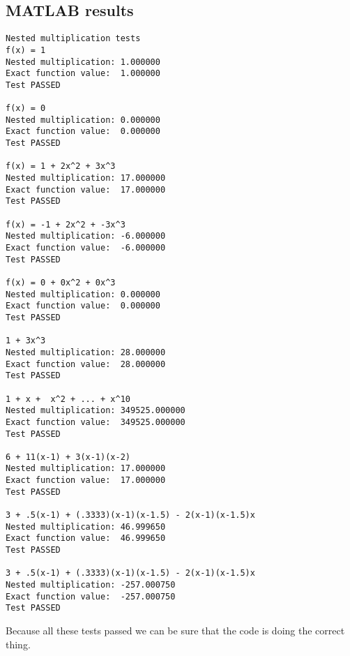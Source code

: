 \documentclass[]{article}
\begin{document}
\subsection*{MATLAB results}
\begin{verbatim}
Nested multiplication tests
f(x) = 1
Nested multiplication: 1.000000
Exact function value:  1.000000
Test PASSED

f(x) = 0
Nested multiplication: 0.000000
Exact function value:  0.000000
Test PASSED

f(x) = 1 + 2x^2 + 3x^3
Nested multiplication: 17.000000
Exact function value:  17.000000
Test PASSED

f(x) = -1 + 2x^2 + -3x^3
Nested multiplication: -6.000000
Exact function value:  -6.000000
Test PASSED

f(x) = 0 + 0x^2 + 0x^3
Nested multiplication: 0.000000
Exact function value:  0.000000
Test PASSED

1 + 3x^3
Nested multiplication: 28.000000
Exact function value:  28.000000
Test PASSED

1 + x +  x^2 + ... + x^10
Nested multiplication: 349525.000000
Exact function value:  349525.000000
Test PASSED

6 + 11(x-1) + 3(x-1)(x-2)
Nested multiplication: 17.000000
Exact function value:  17.000000
Test PASSED

3 + .5(x-1) + (.3333)(x-1)(x-1.5) - 2(x-1)(x-1.5)x
Nested multiplication: 46.999650
Exact function value:  46.999650
Test PASSED

3 + .5(x-1) + (.3333)(x-1)(x-1.5) - 2(x-1)(x-1.5)x
Nested multiplication: -257.000750
Exact function value:  -257.000750
Test PASSED
\end{verbatim}
Because all these tests passed we can be sure that the code is doing the correct thing. 	 
\end{document}
